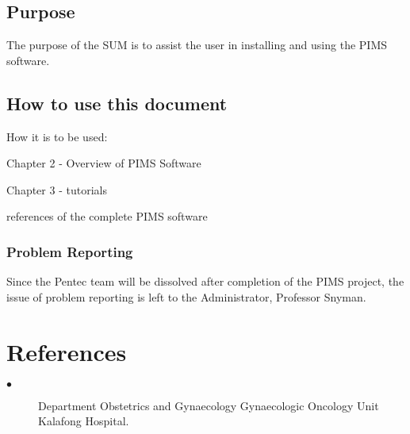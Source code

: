 \documentclass[a4paper,12pt]{report}
\begin{document}
\begin{titlepage}
\subsection{Purpose}
The purpose of the SUM is to assist the user in installing and using the PIMS software.\\

	
\subsection{How to use this document}
	\begin{description}
\item How it is to be used:
\item[$\bullet$]  Chapter 2 - Overview of PIMS Software
\item[$\bullet$] Chapter 3 - tutorials
\item[$\bullet$] references of the complete PIMS software
\end{description}

	
\subsubsection{Problem Reporting}
Since the Pentec team will be dissolved after completion of the PIMS project, the\\
issue of problem reporting is left to the Administrator, Professor Snyman.\\
	


	\section{References}
\begin{description}
\item[$\bullet$] Department Obstetrics and Gynaecology Gynaecologic Oncology Unit Kalafong Hospital.
\end{description}


\end{titlepage}

{} 

\end{document}
